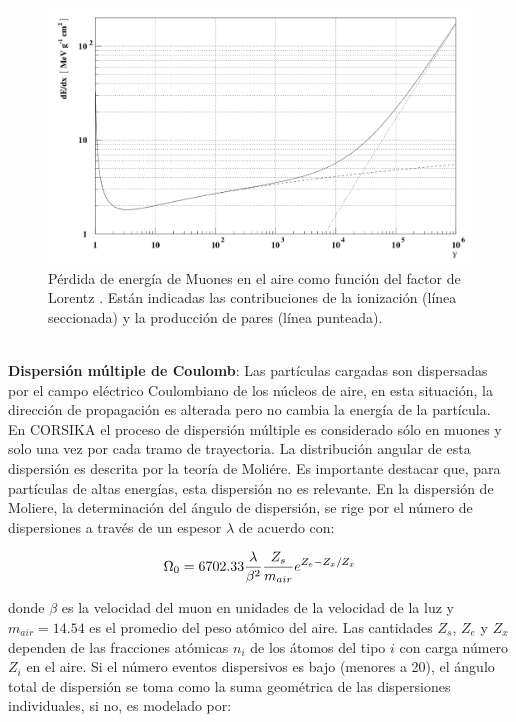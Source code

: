\begin{figure}[htb!]
        \begin{center}
        \includegraphics[width=1\textwidth]{images/Bethe_Muons.png}
        \end{center}
        \caption[Ecuación de Bethe-Bloch para los muones.]{Pérdida de energía de Muones en el aire como función del factor de Lorentz \cite{Heck1998}. Están indicadas las contribuciones de la ionización (línea seccionada) y la producción de pares (línea punteada).}
        \label{fig:fig4}
\end{figure}\\

\textbf{Dispersión múltiple de Coulomb}: Las partículas cargadas son dispersadas por el campo eléctrico Coulombiano de los núcleos de aire, en esta situación, la dirección de propagación es alterada pero no cambia la energía de la partícula. En CORSIKA el proceso de dispersión múltiple es considerado sólo en muones y solo una vez por cada tramo de trayectoria. La distribución angular de esta dispersión es descrita por la teoría de Moliére. Es importante destacar que, para partículas de altas energías, esta dispersión no es relevante. En la dispersión de Moliere, la determinación del ángulo de dispersión, se rige por el número de dispersiones a través de un espesor $\lambda$ de acuerdo con:

\begin{equation}
\centering
\Omega_{0} = 6702.33 \frac{\lambda}{\beta^{2}} \frac{Z_{s}}{m_{air}}e^{Z_{e}-Z_{x} /Z_{x}}
\label{eq:eq21}
\end{equation}

donde $\beta$ es la velocidad del muon en unidades de la velocidad de la luz y $m_{air} = 14.54$ es el promedio del peso atómico del aire. Las cantidades $Z_{s}$, $Z_{e}$ y $Z_{x}$ dependen de las fracciones atómicas $n_{i}$ de los átomos del tipo $i$ con carga número $Z_{i}$ en el aire. Si el número eventos dispersivos es bajo (menores a 20), el ángulo total de dispersión se toma como la suma geométrica de las dispersiones individuales, si no, es modelado por:


